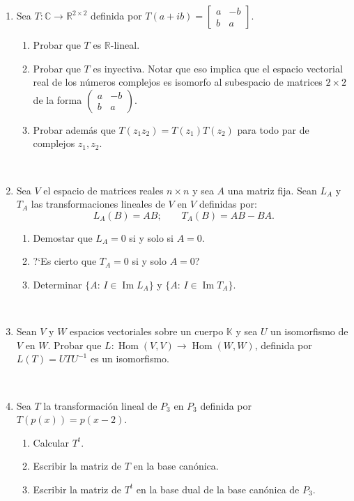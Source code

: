 \documentclass[11pt,spanish,makeidx]{amsbook}
\newcommand\im{\operatorname{Im}}
\newcommand\R{\mathbb{R}}
\newcommand\C{\mathbb{C}}
\newcommand\K {\mathbb{K}}
\newcommand\Hom{\operatorname{Hom}}
\begin{document}
\begin{enumerate}
\

\item Sea $T:\C\longrightarrow \R^{2\times 2}$ definida por
$ T(a+ib)=\begin{bmatrix} a & -b \\ b & a \end{bmatrix}$.
\begin{enumerate}
	\item Probar que $T$ es $\R$-lineal.
	\item Probar que $T$ es inyectiva. Notar que eso implica que el espacio vectorial real de los n\'umeros
	complejos
	es isomorfo al subespacio de matrices $2\times 2$ de la forma
	$\left( \begin{smallmatrix} a & -b \\ b & a \end{smallmatrix} \right)$.
	\item Probar adem\'as que $T(z_1z_2)=T(z_1)T(z_2)$ para todo par de complejos
	$z_1,z_2$.
\end{enumerate}
	
\

\item Sea $V$ el espacio de matrices reales $n \times n$ y sea $A$ una matriz fija.
Sean $L_A$ y $T_A$ las transformaciones lineales de $V$ en $V$ definidas por:
\[ L_A(B)=AB; \qquad T_A(B)=AB-BA. \]
\begin{enumerate}
	\item Demostar que $L_A=0$ si y solo si $A=0$.
	\item ?`Es cierto que $T_A=0$ si y solo $A=0$?
	\item Determinar $\{A: \, I\in\im L_A \}$ y $\{A: \, I\in\im T_A \}$.
\end{enumerate}
	
\

\item Sean $V$ y $W$ espacios vectoriales sobre un cuerpo $\K$ y sea $U$ un isomorfismo de
$V$ en $W$.
Probar que $L:\Hom(V,V) \longrightarrow \Hom(W,W)$, definida por $L(T)=UTU^{-1}$ es un
isomorfismo.
	
\

\item Sea $T$ la transformaci\'on lineal de $P_3$ en $P_3$ definida por $T(p(x))=p(x-2)$.
\begin{enumerate}
	\item Calcular $T^t$.
	\item Escribir la matriz de $T$ en la base can\'onica.
	\item Escribir la matriz de $T^t$ en la base dual de la base can\'onica de $P_3$.
\end{enumerate}


\end{enumerate}
\end{document}
